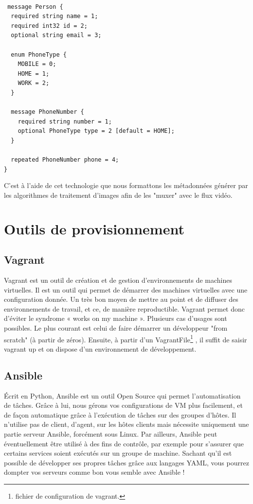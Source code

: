 \begin{lstlisting}[language=protobuf2,style=protobuf , frame=single,caption=modèle pour la structure d'un message,label=proto1]

 message Person {
  required string name = 1;
  required int32 id = 2;
  optional string email = 3;

  enum PhoneType {
    MOBILE = 0;
    HOME = 1;
    WORK = 2;
  }

  message PhoneNumber {
    required string number = 1;
    optional PhoneType type = 2 [default = HOME];
  }

  repeated PhoneNumber phone = 4;
}
\end{lstlisting}

C'est à l'aide de cet technologie que nous formattons les métadonnées générer par les algorithmes de traitement d'images afin de les "muxer" avec le flux vidéo.

\section{Outils de provisionnement}

\subsection{Vagrant}
Vagrant est un outil de création et de gestion d'environnements de machines virtuelles. Il est un outil qui permet de démarrer des machines virtuelles avec une configuration donnée. Un très bon moyen de mettre au point et de diffuser des environnements de travail, et ce, de manière reproductible. Vagrant permet donc d'éviter le syndrome « works on my machine ».
Plusieurs cas d'usages sont possibles. Le plus courant est celui de faire démarrer un développeur "from scratch" (à partir de zéros). Ensuite, à partir d'un VagrantFile\footnote{fichier de configuration de vagrant.} , il suffit de saisir vagrant up et on dispose d'un environnement de développement.

\subsection{Ansible}
Écrit en Python, Ansible est un outil Open Source qui permet l’automatisation de tâches. Grâce à lui, nous gérons vos configurations de VM plus facilement, et de façon automatique grâce à l’exécution de tâches sur des groupes d’hôtes.
Il n’utilise pas de client, d’agent, sur les hôtes clients mais nécessite uniquement une partie serveur Ansible, forcément sous Linux.
Par ailleurs, Ansible peut éventuellement être utilisé à des fins de contrôle, par exemple pour s’assurer que certains services soient exécutés sur un groupe de machine.
Sachant qu’il est possible de développer ses propres tâches grâce aux langages YAML, vous pourrez dompter vos serveurs comme bon vous semble avec Ansible !


